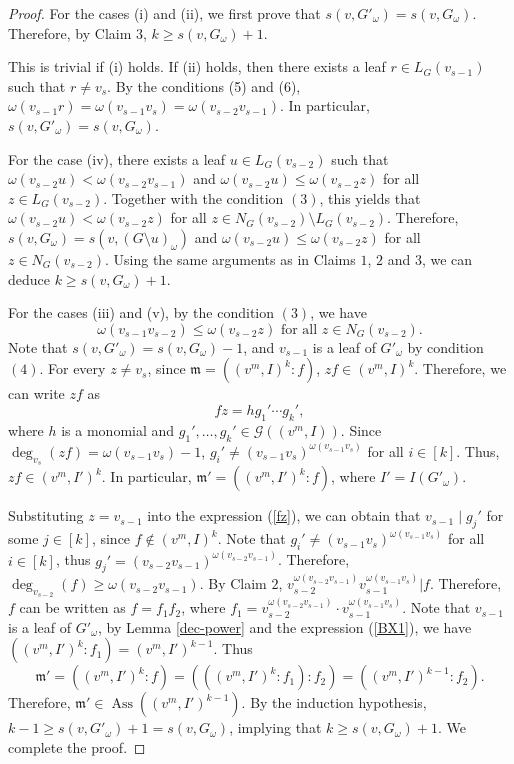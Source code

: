 \documentclass[12pt,amscd]{amsart}
\DeclareMathOperator{\ass}{Ass}
\theoremstyle{definition}
\def\m {\mathfrak m}
\begin{document}
\begin{proof}
For the cases (i) and (ii),  we  first prove that  $s(v,G'_\omega)=s(v,G_\omega)$. Therefore, by Claim $3$,  $k\ge s(v,G_\omega)+1$.  

This is trivial if (i)  holds. If (ii)  holds, then there exists  a leaf $r\in L_G(v_{s-1})$ such that $r\ne v_s$. By the conditions (5) and (6), $\omega(v_{s-1}r)=\omega(v_{s-1}v_{s})=\omega(v_{s-2}v_{s-1})$. In particular, $s(v,G'_{\omega})=s(v,G_{\omega})$. 


For the case (iv), there exists a leaf $u\in L_G(v_{s-2})$ such that $\omega(v_{s-2}u) < \omega(v_{s-2}v_{s-1})$ and $\omega(v_{s-2}u)\leqslant \omega(v_{s-2}z)$ for all  $z\in L_G(v_{s-2})$. Together with the condition $(3)$, this yields that $\omega(v_{s-2}u)<\omega(v_{s-2}z)$ for all $z\in N_G(v_{s-2})\setminus L_G(v_{s-2})$. Therefore,  $s(v,G_\omega) = s(v, (G\setminus u)_\omega)$ and  $\omega(v_{s-2}u) \leqslant \omega(v_{s-2}z)$  for all  $z\in N_G(v_{s-2})$. 
Using the same arguments  as in   Claims $1$, $2$ and $3$, we can deduce $k\geqslant s(v,G_{\omega})+1$. 

For the cases (iii) and (v), by the condition $(3)$, we have 
\begin{equation}\label{BX1}
	\omega(v_{s-1}v_{s-2}) \leqslant \omega(v_{s-2}z) \text{ for all } z\in N_G(v_{s-2}).
	\tag{$\dag$} 
\end{equation}
Note that $s(v,G'_{\omega})=s(v,G_{\omega})-1$, and  $v_{s-1}$ is a leaf of $G'_{\omega}$  by condition $(4)$. For every $z\ne v_s$, since $\m = ((v^m,I)^k \colon f)$, $zf\in (v^m,I)^k$. Therefore,  we can write $zf$ as 
\begin{equation}\label{fz}
	fz = h g_1'\cdots g_k',
	\tag{$\ddag$} 
\end{equation}
where $h$ is a monomial and $g_1',\ldots,g_k'\in \mathcal{G}((v^m,I))$. Since  $\deg_{v_s}(zf)=\omega(v_{s-1}v_s)-1$, $g_i'\ne (v_{s-1}v_s)^{\omega(v_{s-1}v_s)}$ for all $i\in[k]$. Thus, $zf\in (v^m,I')^k$.  In particular, $\m'=((v^m,I')^k\colon f)$,
where $I'=I(G'_\omega)$. 

Substituting  $z=v_{s-1}$ into the expression  (\ref{fz}), we can obtain  that $v_{s-1}\mid g_j'$ for some $j\in[k]$, since $f\notin (v^m,I)^k$.
Note that $g_i'\ne (v_{s-1}v_s)^{\omega(v_{s-1}v_s)}$ for all $i\in [k]$, thus $g_j'=(v_{s-2}v_{s-1})^{\omega(v_{s-2}v_{s-1})}$. Therefore, $\deg_{v_{s-2}}(f)\geqslant \omega(v_{s-2}v_{s-1})$.
By Claim $2$, $v_{s-2}^{\omega(v_{s-2}v_{s-1})}v_{s-1}^{\omega(v_{s-1}v_s)}|f$. Therefore, $f$ can be written as  $f=f_1f_2$, where $f_1= v_{s-2}^{\omega(v_{s-2}v_{s-1})}\cdot v_{s-1}^{\omega(v_{s-1}v_s)}$.
Note that $v_{s-1}$ is a leaf of $G'_{\omega}$, by Lemma \ref{dec-power} and  the expression (\ref{BX1}), we have $((v^m, I')^k \colon f_1)=(v^m, I')^{k-1}$. Thus
$$
\m'= ((v^m, I')^k \colon f) = (((v^m, I')^k \colon f_1)\colon f_2) = ((v^m, I')^{k-1}\colon f_2).
$$
Therefore, $\m'\in\ass((v^m, I')^{k-1})$. By the induction hypothesis, $k-1\geqslant s(v,G'_{\omega})+1=s(v,G_{\omega})$,  implying  that $k\geqslant s(v,G_{\omega})+1$.
We complete the  proof.
\end{proof}
\end{document}
